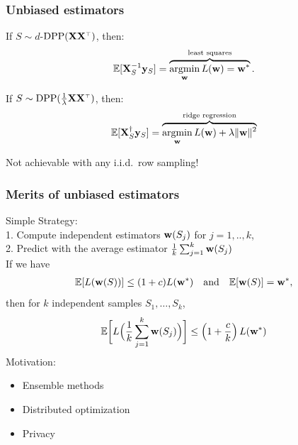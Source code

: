\documentclass[handout]{beamer}
\begin{document}
\begin{frame}
  \frametitle{Unbiased estimators}
  \begin{theorem}
    If $S\sim d$-$\DPP(\X\X^\top)$, then:\vspace{-3mm}
    \begin{align*}
      \mathbb E[\mathbf X_S^{-1}\mathbf y_S] =
      \overbrace{\operatorname*{\mathop{\mathrm{argmin}}}_{\mathbf w}L(\mathbf w)=\mathbf w^*}^{\text{least squares}}.
      \end{align*}
    \end{theorem}
    \pause

    \begin{theorem}
      If $S\sim \DPP(\frac1\lambda\X\X^\top)$, then: \vspace{-3mm}
      \begin{align*}
\mathbb E[\mathbf X_S^\dagger\mathbf y_S]=\overbrace{\operatorname*{\mathop{\mathrm{argmin}}}_\mathbf w L(\mathbf w)+
        \lambda\|\mathbf w\|^2}^{\text{ridge regression}}
        \end{align*}
      \end{theorem}
      \pause
      Not achievable with any i.i.d.~row sampling!
\end{frame}

\begin{frame}
  \frametitle{Merits of unbiased estimators}
Simple Strategy: \\
1. Compute independent estimators $\mathbf w(S_j)$ for $j=1,..,k$,\\
2. Predict with the average estimator $\frac{1}{k}\sum_{j=1}^k\mathbf w(S_j)$\\[4mm]
\pause
If we have 
\begin{align*}
\mathbb E[L(\mathbf w(S))]\leq (1+c)L(\mathbf w^*)
\quad\text{and}\quad\mathbb E[\mathbf w(S)]=\mathbf w^*,
\end{align*}
then for $k$ independent samples $S_1,\ldots,S_k$,
$$\mathbb E\bigg[L\Big(\frac{1}{k}\sum_{j=1}^k \mathbf w(S_j) \Big)\bigg]
  \leq \left(1 + \frac{c}{k}\right)L(\mathbf w^*)$$
\pause
Motivation:
\begin{itemize}
\item Ensemble methods
\item Distributed optimization
\item Privacy
\end{itemize}
\end{frame}
\end{document}
